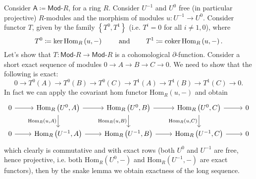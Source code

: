 \begin{ex}
	Consider $\mathsf{A} \coloneqq \mathsf{Mod}\text{-}R$, for a ring $R$.
	Consider $U^{-1}$ and $U^0$ free (in particular projective) $R$-modules
	and the morphism of modules $u\colon U^{-1} \to U^0$.
	Consider functor $T$, given by the family $\left\{ T^0, T^1 \right\}$ (i.e. $T^i = 0$ for all $i \neq 1,0$),
	where
	\begin{equation}
	T^0 \coloneqq \ker \mathrm{Hom}_{R} \left( u, - \right)
	\qquad \text{ and } \qquad
	T^1 \coloneqq \operatorname{coker} \mathrm{Hom}_{R}\left( u, - \right)
	.\end{equation} 
	Let's show that $T\colon\mathsf{Mod}\text{-}R \to \mathsf{Mod}\text{-}R$ is a
	cohomological $\partial$-function.
	Consider a short exact sequence of modules
	$0 \to A\to B \to C \to 0$.
	We need to show that the following is exact:
	\begin{equation}
		0 \to T^0(A) \to T^0(B) \to T^0(C) \to
		T^1(A) \to T^1(B) \to T^1(C) \to 0
	.\end{equation} 
	In fact we can apply the covariant hom functor $\mathrm{Hom}_{R}\left( u, - \right)$ and obtain
	\begin{equation}
	\begin{tikzcd}
		0 \arrow[r, "", rightarrow] &
		\mathrm{Hom}_{R}\left( U^0, A \right) \arrow[r, "", rightarrow]
		\arrow[d, "{\mathrm{Hom}_{R}\left( u , A \right)}"', rightarrow] &
		\mathrm{Hom}_{R}\left( U^0, B \right) \arrow[r, "", rightarrow]
		\arrow[d, "{\mathrm{Hom}_{R}\left( u , B \right)}"', rightarrow] &
		\mathrm{Hom}_{R}\left( U^0, C \right) \arrow[r, "", rightarrow]
		\arrow[d, "{\mathrm{Hom}_{R}\left( u , C \right)}"', rightarrow] &
		0 \\
		0 \arrow[r, "", rightarrow] &
		\mathrm{Hom}_{R}\left( U^{-1}, A \right) \arrow[r, "", rightarrow] &
		\mathrm{Hom}_{R}\left( U^{-1}, B \right) \arrow[r, "", rightarrow] &
		\mathrm{Hom}_{R}\left( U^{-1}, C \right) \arrow[r, "", rightarrow] &
		0 
	\end{tikzcd}
	\end{equation} 
	which clearly is commutative and with exact rows (both $U^0$ and $U^{-1}$ are free,
	hence projective, i.e. both $\mathrm{Hom}_{ R}\left( U^0, - \right)$ and
	$\mathrm{Hom}_{ R}\left( U^{-1}, - \right)$ are exact functors), then by the snake lemma
	we obtain exactness of the long sequence.


\end{ex}
